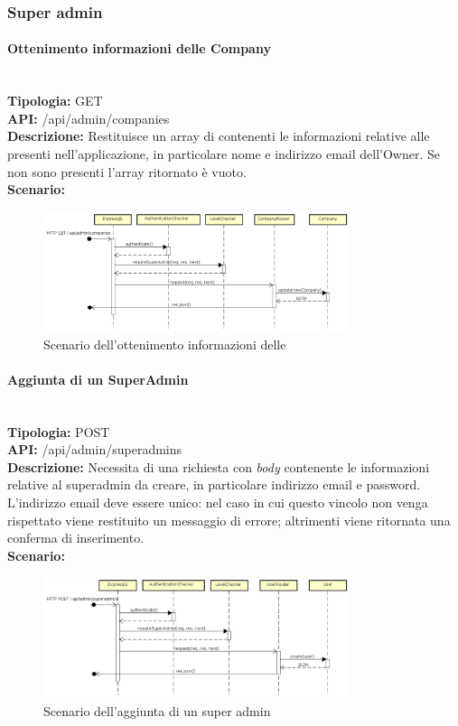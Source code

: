 \newpage
\subsubsection{Super admin}
\paragraph{Ottenimento informazioni delle Company}\mbox{}\\
\textbf{Tipologia:} GET \\
\textbf{API:} /api/admin/companies \\
\textbf{Descrizione:} Restituisce un array di  contenenti le informazioni relative alle  presenti nell'applicazione, in particolare nome e indirizzo email dell'Owner. Se non sono presenti  l'array ritornato è vuoto. \\
\textbf{Scenario:} 
\begin{figure}[H]
\centering
\includegraphics[width=0.8\textwidth]{res/sections/backend/sequence/(GET)companySA.png}
\caption{Scenario dell'ottenimento informazioni delle }
\end{figure}

\newpage
\paragraph{Aggiunta di un SuperAdmin}\mbox{}\\
\textbf{Tipologia:} POST \\
\textbf{API:} /api/admin/superadmins \\
\textbf{Descrizione:} Necessita di una richiesta con \textit{body} contenente le informazioni relative al superadmin da creare, in particolare indirizzo email e password. L'indirizzo email deve essere unico: nel caso in cui questo vincolo non venga rispettato viene restituito un messaggio di errore; altrimenti viene ritornata una conferma di inserimento. \\
\textbf{Scenario:} 
\begin{figure}[H]
\centering
\includegraphics[width=0.8\textwidth]{res/sections/backend/sequence/(POST)superadmin.png}
\caption{Scenario dell'aggiunta di un super admin}
\end{figure}

